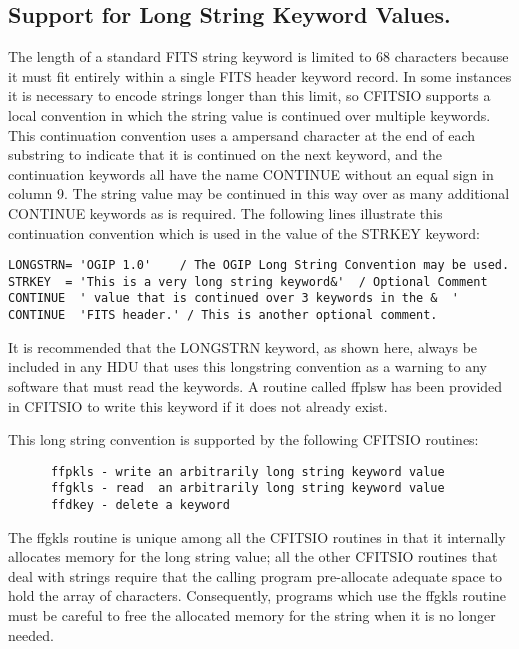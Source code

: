 \subsection{Support for Long String Keyword Values.}

The length of a standard FITS string keyword is limited to 68
characters because it must fit entirely within a single FITS header
keyword record.  In some instances it is necessary to encode strings
longer than this limit, so CFITSIO supports a local convention in which
the string value is continued over multiple keywords.  This
continuation convention uses a ampersand character at the end of each
substring to indicate that it is continued on the next keyword, and the
continuation keywords all have the name CONTINUE without an equal sign
in column 9. The string value may be continued in this way over as many
additional CONTINUE keywords as is required.  The following lines
illustrate this continuation convention which is used in the value of
the STRKEY keyword:

\begin{verbatim}
LONGSTRN= 'OGIP 1.0'    / The OGIP Long String Convention may be used.
STRKEY  = 'This is a very long string keyword&'  / Optional Comment
CONTINUE  ' value that is continued over 3 keywords in the &  '
CONTINUE  'FITS header.' / This is another optional comment.
\end{verbatim}
It is recommended that the LONGSTRN keyword, as shown here, always be
included in any HDU that uses this longstring convention as a warning
to any software that must read the keywords.  A routine called ffplsw
has been provided in CFITSIO to write this keyword if it does not
already exist.

  This long string convention is supported by the following CFITSIO
routines:

\begin{verbatim}
      ffpkls - write an arbitrarily long string keyword value
      ffgkls - read  an arbitrarily long string keyword value
      ffdkey - delete a keyword
\end{verbatim}
The ffgkls routine is unique among all the CFITSIO routines in that it
internally allocates memory for the long string value;  all the other
CFITSIO routines that deal with strings require that the calling
program pre-allocate adequate space to hold the array of characters.
Consequently, programs which use the ffgkls routine must be careful to
free the allocated memory for the string when it is no longer needed.

